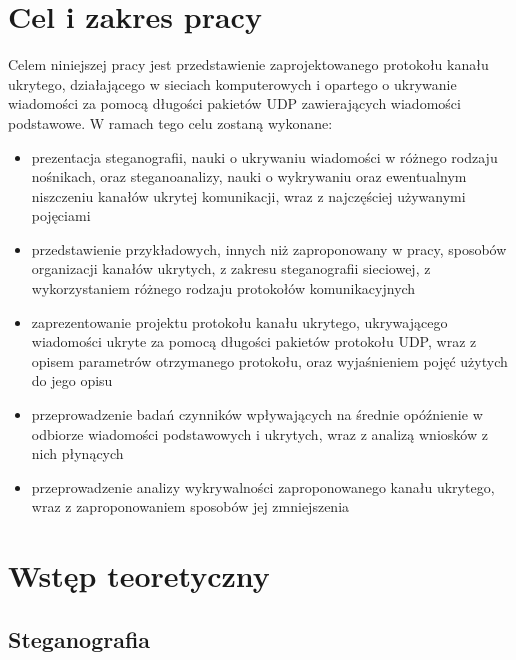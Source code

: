 \documentclass[a4paper, twoside]{report}
\begin{document}
\chapter{Cel i zakres pracy}
    Celem niniejszej pracy jest przedstawienie zaprojektowanego protokołu kanału
    ukrytego, działającego w sieciach komputerowych i  opartego o ukrywanie wiadomości za pomocą długości pakietów UDP
    zawierających wiadomości podstawowe. W ramach tego celu zostaną wykonane:
    \begin{itemize}
        \item prezentacja steganografii, nauki o ukrywaniu wiadomości w różnego rodzaju nośnikach,
            oraz steganoanalizy, nauki o wykrywaniu oraz ewentualnym niszczeniu kanałów
            ukrytej komunikacji, wraz z najczęściej używanymi pojęciami
        \item przedstawienie przykładowych, innych niż zaproponowany w pracy,
            sposobów organizacji kanałów ukrytych, z zakresu steganografii sieciowej,
            z wykorzystaniem różnego rodzaju protokołów komunikacyjnych
        \item zaprezentowanie projektu protokołu kanału ukrytego, ukrywającego
            wiadomości ukryte za pomocą długości pakietów protokołu UDP, wraz
            z opisem parametrów otrzymanego protokołu, oraz wyjaśnieniem pojęć
            użytych do jego opisu
        \item przeprowadzenie badań czynników wpływających na średnie opóźnienie
            w odbiorze wiadomości podstawowych i ukrytych, wraz z analizą wniosków
            z nich płynących
        \item przeprowadzenie analizy wykrywalności zaproponowanego kanału ukrytego,
            wraz z zaproponowaniem sposobów jej zmniejszenia
    \end{itemize}

\chapter{Wstęp teoretyczny}
    \section{Steganografia}
\end{document}
